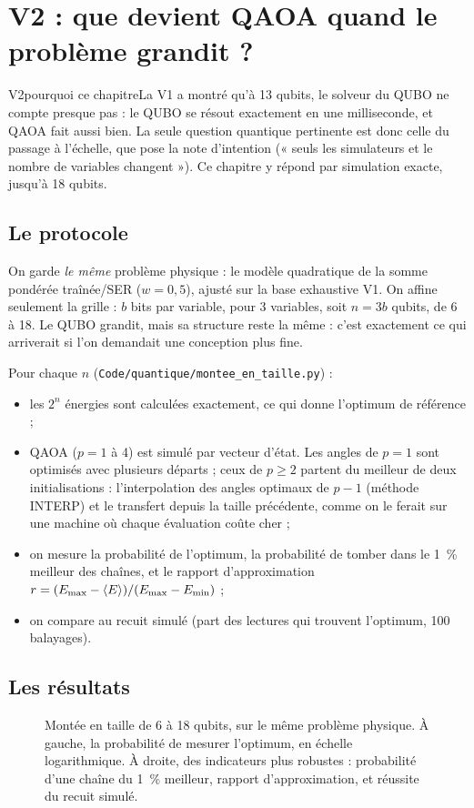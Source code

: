 \chapter{V2 : que devient QAOA quand le problème grandit ?}\label{ch:montee}

\begin{evolution}{V2}{pourquoi ce chapitre}La V1 a montré qu'à 13 qubits, le solveur du QUBO ne compte presque pas : le QUBO se résout exactement en une milliseconde, et QAOA fait aussi bien. La seule question quantique pertinente est donc celle du passage à l'échelle, que pose la note d'intention (« seuls les simulateurs et le nombre de variables changent »). Ce chapitre y répond par simulation exacte, jusqu'à 18 qubits.\end{evolution}

\section{Le protocole}
On garde \emph{le même} problème physique : le modèle quadratique de la somme pondérée traînée/SER ($w=0{,}5$), ajusté sur la base exhaustive V1. On affine seulement la grille : $b$ bits par variable, pour 3 variables, soit $n=3b$ qubits, de 6 à 18. Le QUBO grandit, mais sa structure reste la même : c'est exactement ce qui arriverait si l'on demandait une conception plus fine.

Pour chaque $n$ (\texttt{Code/quantique/montee\_en\_taille.py}) :
\begin{itemize}
\item les $2^n$ énergies sont calculées exactement, ce qui donne l'optimum de référence ;
\item QAOA ($p=1$ à 4) est simulé par vecteur d'état. Les angles de $p=1$ sont optimisés avec plusieurs départs ; ceux de $p\ge2$ partent du meilleur de deux initialisations : l'interpolation des angles optimaux de $p-1$ (méthode INTERP) et le transfert depuis la taille précédente, comme on le ferait sur une machine où chaque évaluation coûte cher ;
\item on mesure la probabilité de l'optimum, la probabilité de tomber dans le 1~\% meilleur des chaînes, et le rapport d'approximation $r=(E_{\max}-\langle E\rangle)/(E_{\max}-E_{\min})$ ;
\item on compare au recuit simulé (part des lectures qui trouvent l'optimum, 100 balayages).
\end{itemize}

\section{Les résultats}
\begin{figure}[htbp]
\centering

\caption{Montée en taille de 6 à 18 qubits, sur le même problème physique. À gauche, la probabilité de mesurer l'optimum, en échelle logarithmique. À droite, des indicateurs plus robustes : probabilité d'une chaîne du 1~\% meilleur, rapport d'approximation, et réussite du recuit simulé.}\label{fig:montee}
\end{figure}

